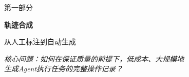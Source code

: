 \documentclass[aspectratio=169, 11pt]{beamer}
\begin{document}
\begin{frame}[plain]
\vfill
\begin{center}
{\large\color{gray} 第一部分}

\vspace{8pt}
{\LARGE\bfseries\color{mainblue} 轨迹合成}

\vspace{12pt}
{\normalsize 从人工标注到自动生成}

\vspace{16pt}

\vspace{10pt}
{\small\textit{核心问题：如何在保证质量的前提下，低成本、大规模地\\生成Agent执行任务的完整操作记录？}}
\end{center}
\vfill
\end{frame}
\end{document}
